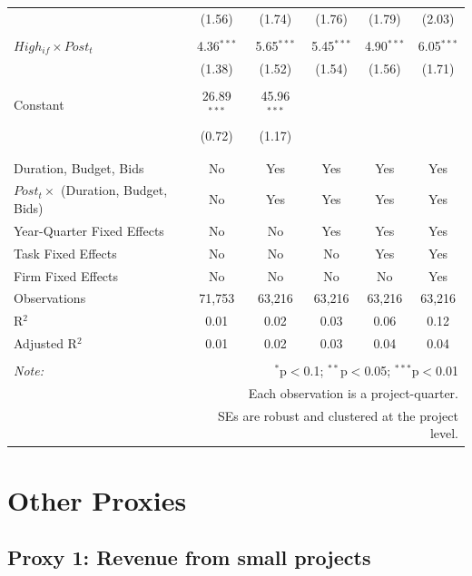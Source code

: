 \documentclass[
]{article}
\begin{document}
\begin{table}[H]
\begin{tabular}{@{\extracolsep{-2pt}}lccccc}
  & (1.56) & (1.74) & (1.76) & (1.79) & (2.03) \\ 
  & & & & & \\ 
 $High_{if} \times Post_t$ & 4.36$^{***}$ & 5.65$^{***}$ & 5.45$^{***}$ & 4.90$^{***}$ & 6.05$^{***}$ \\ 
  & (1.38) & (1.52) & (1.54) & (1.56) & (1.71) \\ 
  & & & & & \\ 
 Constant & 26.89$^{***}$ & 45.96$^{***}$ &  &  &  \\ 
  & (0.72) & (1.17) &  &  &  \\ 
  & & & & & \\ 
\hline \\[-1.8ex] 
Duration, Budget, Bids & No & Yes & Yes & Yes & Yes \\ 
$Post_t \times$  (Duration, Budget, Bids) & No & Yes & Yes & Yes & Yes \\ 
Year-Quarter Fixed Effects & No & No & Yes & Yes & Yes \\ 
Task Fixed Effects & No & No & No & Yes & Yes \\ 
Firm Fixed Effects & No & No & No & No & Yes \\ 
Observations & 71,753 & 63,216 & 63,216 & 63,216 & 63,216 \\ 
R$^{2}$ & 0.01 & 0.02 & 0.03 & 0.06 & 0.12 \\ 
Adjusted R$^{2}$ & 0.01 & 0.02 & 0.03 & 0.04 & 0.04 \\ 
\hline 
\hline \\[-1.8ex] 
\textit{Note:}  & \multicolumn{5}{r}{$^{*}$p$<$0.1; $^{**}$p$<$0.05; $^{***}$p$<$0.01} \\ 
 & \multicolumn{5}{r}{Each observation is a project-quarter.} \\ 
 & \multicolumn{5}{r}{SEs are robust and clustered at the project level.} \\ 
\end{tabular} 
\end{table}

\hypertarget{other-proxies}{%
\section{Other Proxies}\label{other-proxies}}

\hypertarget{proxy-1-revenue-from-small-projects}{%
\subsection{Proxy 1: Revenue from small
projects}\label{proxy-1-revenue-from-small-projects}}
\end{document}
